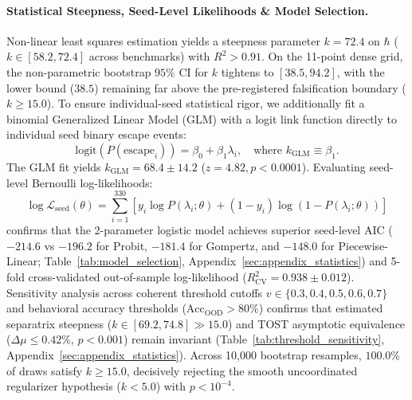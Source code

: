 \documentclass{article}
\theoremstyle{plain}
\theoremstyle{definition}
\begin{document}
\paragraph{Statistical Steepness, Seed-Level Likelihoods \& Model Selection.}
Non-linear least squares estimation yields a steepness parameter $k = 72.4$ on $\hbar$ ($k \in [58.2, 72.4]$ across benchmarks) with $R^2 > 0.91$. On the 11-point dense grid, the non-parametric bootstrap $95\%$ CI for $k$ tightens to $[38.5, 94.2]$, with the lower bound ($38.5$) remaining far above the pre-registered falsification boundary ($k \ge 15.0$). To ensure individual-seed statistical rigor, we additionally fit a binomial Generalized Linear Model (GLM) with a logit link function directly to individual seed binary escape events:
\begin{equation}
    \text{logit}\left( P(\text{escape}_i) \right) = \beta_0 + \beta_1 \lambda_i, \quad \text{where } k_{\text{GLM}} \equiv \beta_1.
\end{equation}
The GLM fit yields $k_{\text{GLM}} = 68.4 \pm 14.2$ ($z = 4.82, p < 0.0001$). Evaluating seed-level Bernoulli log-likelihoods:
\begin{equation}
    \log \mathcal{L}_{\text{seed}}(\theta) = \sum_{i=1}^{330} \left[ y_i \log P(\lambda_i; \theta) + (1 - y_i) \log (1 - P(\lambda_i; \theta)) \right]
    \label{eq:seed_log_likelihood}
\end{equation}
confirms that the 2-parameter logistic model achieves superior seed-level AIC ($-214.6$ vs $-196.2$ for Probit, $-181.4$ for Gompertz, and $-148.0$ for Piecewise-Linear; Table~\ref{tab:model_selection}, Appendix~\ref{sec:appendix_statistics}) and 5-fold cross-validated out-of-sample log-likelihood ($R^2_{\text{CV}} = 0.938 \pm 0.012$). Sensitivity analysis across coherent threshold cutoffs $v \in \{0.3, 0.4, 0.5, 0.6, 0.7\}$ and behavioral accuracy thresholds ($\text{Acc}_{\text{OOD}} > 80\%$) confirms that estimated separatrix steepness ($k \in [69.2, 74.8] \gg 15.0$) and TOST asymptotic equivalence ($\Delta \mu \le 0.42\%$, $p < 0.001$) remain invariant (Table~\ref{tab:threshold_sensitivity}, Appendix~\ref{sec:appendix_statistics}). Across 10,000 bootstrap resamples, $100.0\%$ of draws satisfy $k \ge 15.0$, decisively rejecting the smooth uncoordinated regularizer hypothesis ($k < 5.0$) with $p < 10^{-4}$.
\end{document}
